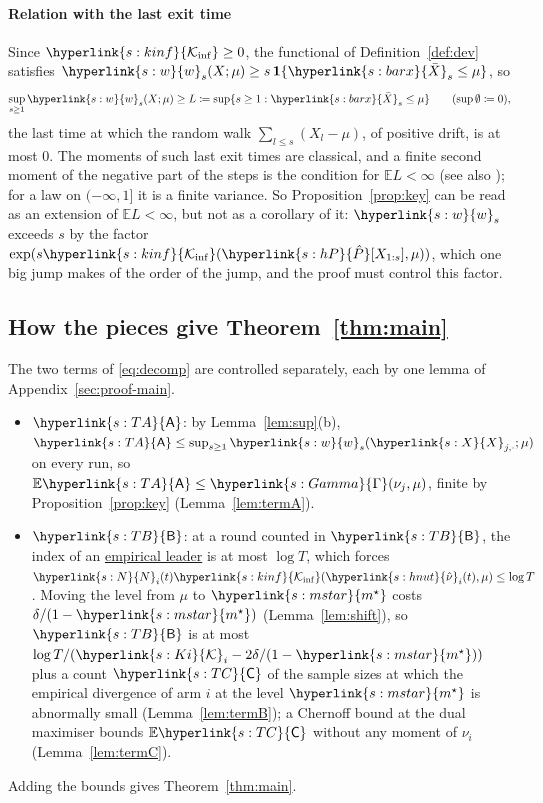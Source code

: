 \documentclass[11pt]{article}
\newcommand{\E}{\mathbb{E}}
\newcommand{\ind}{\mathbf{1}}
\newcommand{\sy}[2]{{\hyperlink{#1}{#2}}}
\newcommand{\term}[2]{\hyperlink{#1}{#2}}
\newcommand{\ms}{\sy{s:mstar}{m^{\star}}}
\newcommand{\Kinf}{\sy{s:kinf}{\mathcal{K}_{\inf}}}
\newcommand{\hP}{\sy{s:hP}{\hat{P}}}
\newcommand{\bX}{\sy{s:barx}{\bar{X}}}
\newcommand{\Xs}{\sy{s:X}{X}}
\newcommand{\Np}{\sy{s:N}{N}}
\newcommand{\hnut}{\sy{s:hnut}{\hat{\nu}}}
\newcommand{\ws}{\sy{s:w}{w}}
\newcommand{\Gam}{\sy{s:Gamma}{\Gamma}}
\newcommand{\Ki}{\sy{s:Ki}{\mathcal{K}}}
\newcommand{\TA}{\sy{s:TA}{\mathsf{A}}}
\newcommand{\TB}{\sy{s:TB}{\mathsf{B}}}
\newcommand{\TC}{\sy{s:TC}{\mathsf{C}}}
\begin{document}
\paragraph{Relation with the last exit time} Since $\Kinf\ge0$, the functional of
Definition~\ref{def:dev} satisfies $\ws_s(X;\mu)\ge s\,\ind\{\bX_s\le\mu\}$, so
\begin{equation*}
  \sup_{s\ge1}\ws_s(X;\mu)\ge L\coloneqq\sup\{s\ge1:\bX_s\le\mu\}\qquad(\sup\emptyset\coloneqq0),
\end{equation*}
the last time at which the random walk $\sum_{l\le s}(X_l-\mu)$, of positive drift, is at most $0$.
The moments of such last exit times are classical, and a finite second moment of the negative part of
the steps is the condition for $\E L<\infty$ (see also \citealp{CL75,Jan86}); for a law on
$(-\infty,1]$ it is a finite variance. So Proposition~\ref{prop:key} can be read as an extension of
$\E L<\infty$, but not as a corollary of it: $\ws_s$ exceeds $s$ by the factor
$\exp(s\Kinf(\hP[X_{1:s}],\mu))$, which one big jump makes of the order of the jump, and the proof
must control this factor.

\subsection{How the pieces give Theorem~\ref{thm:main}}\label{sec:overview-combine}

The two terms of \eqref{eq:decomp} are controlled separately, each by one lemma of
Appendix~\ref{sec:proof-main}.
\begin{itemize}[leftmargin=*]
  \item $\TA$: by Lemma~\ref{lem:sup}(b), $\TA\le\sup_{s\ge1}\ws_s(\Xs_{j,\cdot};\mu)$ on every run, so
    $\E\TA\le\Gam(\nu_j,\mu)$, finite by Proposition~\ref{prop:key} (Lemma~\ref{lem:termA}).
  \item $\TB$: at a round counted in $\TB$, the index of an \term{w:leader}{empirical leader} is at most $\log T$,
    which forces $\Np_i(t)\Kinf(\hnut_i(t),\mu)\le\log T$. Moving the level from $\mu$ to $\ms$ costs
    $\delta/(1-\ms)$ (Lemma~\ref{lem:shift}), so $\TB$ is at most $\log T/(\Ki_i-2\delta/(1-\ms))$ plus
    a count $\TC$ of the sample sizes at which the empirical divergence of arm $i$ at the level $\ms$ is
    abnormally small (Lemma~\ref{lem:termB}); a Chernoff bound at the dual maximiser bounds $\E\TC$
    without any moment of $\nu_i$ (Lemma~\ref{lem:termC}).
\end{itemize}
Adding the bounds gives Theorem~\ref{thm:main}.
\end{document}
